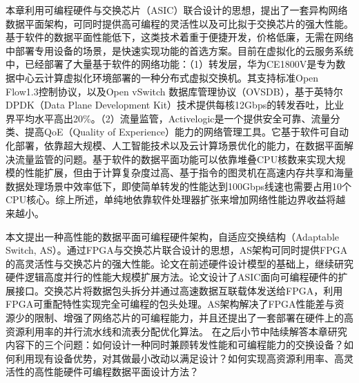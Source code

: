 
 \label{chap4}


\label{chap41}

本章利用可编程硬件与交换芯片（ASIC）联合设计的思想，提出了一套异构网络数据平面架构，可同时提供高可编程的灵活性以及可比拟于交换芯片的强大性能。基于软件的数据平面性能低下，这类技术着重于便捷开发，价格低廉，无需在网络中部署专用设备的场景，是快速实现功能的首选方案。目前在虚拟化的云服务系统中，已经部署了大量基于软件的网络功能：（1）转发层，华为CE1800V是专为数据中心云计算虚拟化环境部署的一种分布式虚拟交换机。其支持标准Open Flow1.3控制协议，以及Open vSwitch 数据库管理协议（OVSDB），基于英特尔DPDK（Data Plane Development Kit）技术提供每核12Gbps的转发吞吐，比业界平均水平高出20\%。（2）流量监管，Activelogic是一个提供安全可靠、流量分类、提高QoE（Quality of Experience）能力的网络管理工具。它基于软件可自动化部署，依靠超大规模、人工智能技术以及云计算场景优化的能力，在数据平面解决流量监管的问题。基于软件的数据平面功能可以依靠堆叠CPU核数来实现大规模的性能扩展，但由于计算复杂度过高、基于指令的图灵机在高速内存共享和海量数据处理场景中效率低下，即使简单转发的性能达到100Gbps线速也需要占用10个CPU核心。综上所述，单纯地依靠软件处理器扩张来增加网络性能边界收益将越来越小。


本文提出一种高性能的数据平面可编程硬件架构，自适应交换结构（Adaptable Switch, AS）。通过FPGA与交换芯片联合设计的思想，AS架构可同时提供FPGA的高灵活性与交换芯片的强大性能。论文在前述硬件设计模型的基础上，继续研究硬件逻辑高度并行的性能大规模扩展方法。论文设计了ASIC面向可编程硬件的扩展接口。交换芯片将数据包头拆分并通过高速数据互联载体发送给FPGA，利用FPGA可重配特性实现完全可编程的包头处理。AS架构解决了FPGA性能差与资源少的限制、增强了网络芯片的可编程能力，并且还提出了一套部署在硬件上的高资源利用率的并行流水线和流表分配优化算法。
在之后小节中陆续解答本章研究内容下的三个问题：如何设计一种同时兼顾转发性能和可编程能力的交换设备？如何利用现有设备优势，对其做最小改动以满足设计？如何实现高资源利用率、高灵活性的高性能硬件可编程数据平面设计方法？


\label{chap42}

